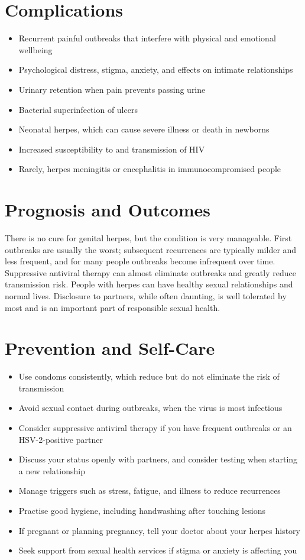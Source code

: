 \section*{Complications}
\begin{itemize}
    \item Recurrent painful outbreaks that interfere with physical and emotional wellbeing
    \item Psychological distress, stigma, anxiety, and effects on intimate relationships
    \item Urinary retention when pain prevents passing urine
    \item Bacterial superinfection of ulcers
    \item Neonatal herpes, which can cause severe illness or death in newborns
    \item Increased susceptibility to and transmission of HIV
    \item Rarely, herpes meningitis or encephalitis in immunocompromised people
\end{itemize}

\section*{Prognosis and Outcomes}
There is no cure for genital herpes, but the condition is very manageable. First outbreaks are usually the worst; subsequent recurrences are typically milder and less frequent, and for many people outbreaks become infrequent over time. Suppressive antiviral therapy can almost eliminate outbreaks and greatly reduce transmission risk. People with herpes can have healthy sexual relationships and normal lives. Disclosure to partners, while often daunting, is well tolerated by most and is an important part of responsible sexual health.

\section*{Prevention and Self-Care}
\begin{itemize}
    \item Use condoms consistently, which reduce but do not eliminate the risk of transmission
    \item Avoid sexual contact during outbreaks, when the virus is most infectious
    \item Consider suppressive antiviral therapy if you have frequent outbreaks or an HSV-2-positive partner
    \item Discuss your status openly with partners, and consider testing when starting a new relationship
    \item Manage triggers such as stress, fatigue, and illness to reduce recurrences
    \item Practise good hygiene, including handwashing after touching lesions
    \item If pregnant or planning pregnancy, tell your doctor about your herpes history
    \item Seek support from sexual health services if stigma or anxiety is affecting you
\end{itemize}

